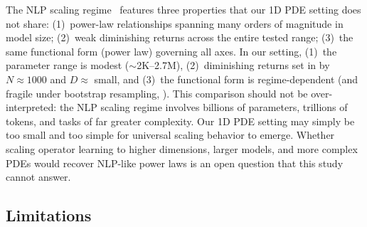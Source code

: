 \documentclass[11pt]{article}
\begin{document}
The NLP scaling regime~\citep{kaplan2020scaling,hoffmann2022training}
features three properties that our 1D PDE setting does not share:
(1)~power-law relationships spanning many orders of magnitude in
model size; (2)~weak diminishing returns across the entire tested
range; (3)~the same functional form (power law) governing all axes.
In our setting, (1)~the parameter range is modest
($\sim$2K--2.7M), (2)~diminishing returns set in by $N \approx 1000$
and $D \approx$ small, and (3)~the functional form is
regime-dependent (and fragile under bootstrap resampling,
).
This comparison should not be over-interpreted: the NLP scaling regime
involves billions of parameters, trillions of tokens, and tasks of
far greater complexity. Our 1D PDE setting may simply be too small
and too simple for universal scaling behavior to emerge. Whether
scaling operator learning to higher dimensions, larger models, and
more complex PDEs would recover NLP-like power laws is an open
question that this study cannot answer.

\subsection{Limitations}
\label{sec:limitations}
\end{document}
